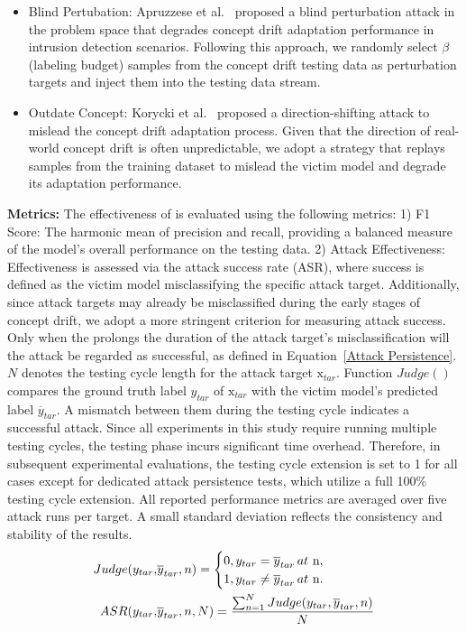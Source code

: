 \begin{itemize}[leftmargin=0.35cm]
	\item Blind Pertubation: Apruzzese et al.~\cite{apruzzese2024adversarial} proposed a blind perturbation attack in the problem space that degrades concept drift adaptation performance in intrusion detection scenarios.
	Following this approach, we randomly select $\beta$ (labeling budget) samples from the concept drift testing data as perturbation targets and inject them into the testing data stream.
	\item Outdate Concept: Korycki et al.~\cite{2023-CCF-B-Adversarial-concept-drift-detection-under-poisoning-attacks} proposed a direction-shifting attack to mislead the concept drift adaptation process.
	Given that the direction of real-world concept drift is often unpredictable, we adopt a strategy that replays samples from the training dataset to mislead the victim model and degrade its adaptation performance.
\end{itemize}

\textbf{Metrics:} 
The effectiveness of \pandora is evaluated using the following metrics:
1) F1 Score: The harmonic mean of precision and recall, providing a balanced measure of the model’s overall performance on the testing data.
2) Attack Effectiveness: Effectiveness is assessed via the attack success rate (ASR), where success is defined as the victim model misclassifying the specific attack target.
Additionally, since attack targets may already be misclassified during the early stages of concept drift, we adopt a more stringent criterion for measuring attack success.
Only when the \pandora prolongs the duration of the attack target’s misclassification will the attack be regarded as successful, as defined in Equation~\ref{Attack Persistence}.
$N$ denotes the \pandora testing cycle length for the attack target $\bm{\mathrm{x}}_{tar}$. 
Function $Judge()$ compares the ground truth label $y_{tar}$ of $\bm{\mathrm{x}}_{tar}$ with the victim model’s predicted label $\overline{y}_{tar}$. 
A mismatch between them during the testing cycle indicates a successful attack.
Since all experiments in this study require running multiple testing cycles, the testing phase incurs significant time overhead.
Therefore, in subsequent experimental evaluations, the testing cycle extension is set to 1 for all cases except for dedicated attack persistence tests, which utilize a full 100\% testing cycle extension.
All reported performance metrics are averaged over five attack runs per target.
A small standard deviation reflects the consistency and stability of the results.
\begin{align}
	Judge(y_{tar}, & \overline{y}_{tar},n) =
	\begin{cases} 
		0,y_{tar}=\overline{y}_{tar} \, at \,\, $n$, \\
		1,y_{tar} \neq \overline{y}_{tar} \, at \,\, $n$.
	\end{cases}  \\
	ASR(y_{tar},& \overline{y}_{tar},n,N)  = \frac {\sum_{n=1}^{N}Judge(y_{tar}, \overline{y}_{tar},n)}{N}
	\label{Attack Persistence}
\end{align}


